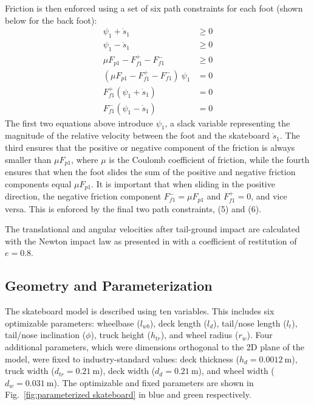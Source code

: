 \documentclass[default,iicol,pdflatex]{sn-jnl}
\begin{document}
Friction is then enforced using a set of six path constraints for each foot (shown below for the back foot):
\begin{align} \label{e_frictioncontrol}
    \psi_1 + \dot s_1  &\geq 0 \\
    \psi_1 - \dot s_1  &\geq 0 \\
    \mu F_{p1} - F_{f1}^+ - F_{f1}^- &\geq 0 \\
    (\mu F_{p1} - F_{f1}^+ - F_{f1}^-)\ \psi_1  &= 0 \\
    F_{f1}^+ (\psi_1 + \dot s_1)  &= 0 \\
    F_{f1}^- (\psi_1 - \dot s_1)  &= 0
\end{align}
The first two equations above introduce $\psi_1$, a slack variable representing the magnitude of the relative velocity between the foot and the skateboard $\dot{s}_1$. The third ensures that the positive or negative component of the friction is always smaller than $\mu F_{p1}$, where $\mu$ is the Coulomb coefficient of friction, while the fourth ensures that when the foot slides the sum of the positive and negative friction components equal $\mu F_{p1}$. It is important that when sliding in the positive direction, the negative friction component $F_{f1}^- = \mu F_{p1}$ and $F_{f1}^+=0$, and vice versa. This is enforced by the final two path constraints, (5) and (6).

The translational and angular velocities after tail-ground impact are calculated with the Newton impact law as presented in \citet{vallery_heike_advanced_2018} with a coefficient of restitution of $e=0.8$.

\subsection{Geometry and Parameterization}\label{s_paropt}
The skateboard model is described using ten variables. This includes six optimizable parameters: wheelbase ($l_{wb}$), deck length ($l_{d}$), tail/nose length ($l_{t}$), tail/nose inclination ($\phi$), truck height ($h_{tr}$), and wheel radius ($r_w$). Four additional parameters, which were dimensions orthogonal to the 2D plane of the model, were fixed to industry-standard values: deck thickness ($h_d = \SI{0.0012}{\meter}$), truck width ($d_{tr} = \SI{0.21}{\meter}$), deck width ($d_d = \SI{0.21}{\meter}$), and wheel width ($d_w = \SI{0.031}{\meter}$). The optimizable and fixed parameters are shown in Fig.~\ref{fig:parameterized skateboard} in blue and green respectively.
\end{document}
